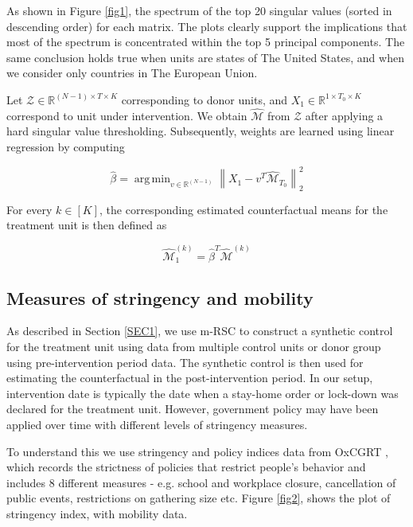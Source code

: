 \documentclass[fleqn,10pt]{wlscirep}
\DeclareMathOperator*{\argmin}{arg\,min}
\begin{document}
	As shown in Figure \ref{fig1}, the spectrum of the top 20 singular values (sorted in descending order) for each matrix. The plots clearly support the implications that most of the spectrum is concentrated within the top 5 principal components. The same conclusion holds true when units are states of The United States, and when we consider only countries in The  European Union.\par
	
	Let $\mathcal{Z} \in \mathbb{R}^{(N-1) \times T \times K}$ corresponding to donor units, and $X_1 \in \mathbb{R}^{1 \times T_0 \times K}$ correspond to unit under intervention. We obtain $\hat{\mathcal{M}}$ from $\mathcal{Z}$ after applying a hard singular value thresholding. Subsequently, weights are learned using linear regression by computing
	
	\begin{equation*}
	\hat{\beta} = \argmin_{v \in \mathbb{R}^{(N-1)} } \left\| X_1 - v^T \hat{\mathcal{M}}_{T_0}\right\|^2_2
	\end{equation*}
	
	For every $k \in [K]$, the corresponding estimated counterfactual means for the treatment unit is then defined as
	
	\begin{equation*}
	\hat{\mathcal{M}}_1^{(k)} = \hat{\beta}^T \hat{\mathcal{M}}^{(k)}
	\end{equation*}
	
	\subsection*{Measures of stringency and mobility}
	As described in Section \ref{SEC1}, we use m-RSC to construct a synthetic control for the treatment unit using data from multiple control units or donor group using pre-intervention period data.  The synthetic control is then used for estimating the counterfactual in the post-intervention period. In our setup, intervention date is typically the date when a stay-home order or lock-down was declared for the treatment unit.  However, government policy may have been applied over time with different levels of stringency measures. 
	
	To understand this we use stringency and policy indices data from OxCGRT \cite{HWP2020}, which records the strictness of policies that restrict people’s behavior and includes 8 different measures - e.g. school  and workplace closure, cancellation of public events, restrictions on gathering size etc. Figure \ref{fig2}, shows the plot of stringency index, with mobility data. 
\end{document}

